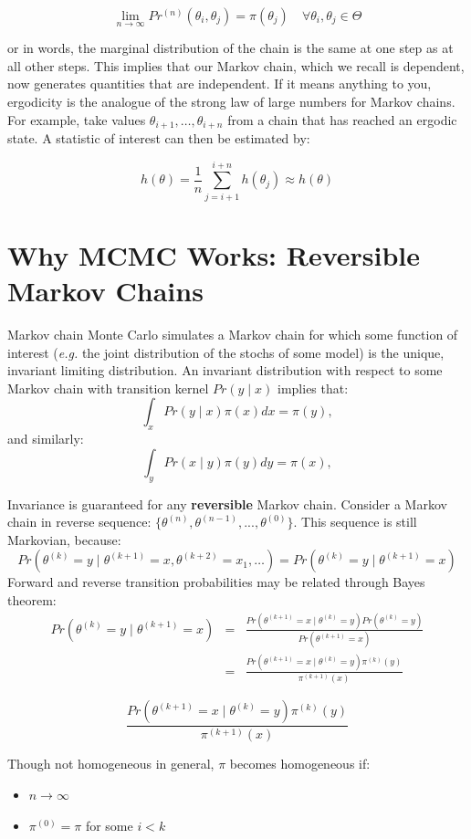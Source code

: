\documentclass[]{book}
\begin{document}
\begin{itemize}
\[
\lim_{n \to \infty} Pr^{(n)}(\theta_i,\theta_j) = \pi(\theta_j) \quad \forall \theta_i, \theta_j \in \Theta
\]

\noindent or in words, the marginal distribution of the chain is the same at one step as at all other steps. This implies that our Markov chain, which we recall is dependent, now generates quantities that are independent. If it means anything to you, ergodicity is the analogue of the strong law of large numbers for Markov chains. For example, take values $\theta_{i+1},\ldots,\theta_{i+n}$ from a chain that has reached an ergodic state. A statistic of interest can then be estimated by:

\[
\hat{h}(\theta) = \frac{1}{n}\sum_{j=i+1}^{i+n} h(\theta_j) \approx h(\theta)
\]

\end{itemize}

\section{Why MCMC Works: Reversible Markov Chains}

Markov chain Monte Carlo simulates a Markov chain for which some function of interest (\emph{e.g.} the joint distribution of the stochs of some model) is the unique, invariant limiting distribution. An invariant distribution with respect to some Markov chain with transition kernel $Pr(y \mid x)$ implies that:
\[
\int_x Pr(y \mid x) \pi(x) dx = \pi(y),
\]
and similarly:
\[
\int_y Pr(x \mid y) \pi(y) dy = \pi(x),
\]

Invariance is guaranteed for any \textbf{reversible} Markov chain. Consider a Markov chain in reverse sequence: $\{\theta^{(n)},\theta^{(n-1)},...,\theta^{(0)}\}$. This sequence is still Markovian, because:
\[
Pr(\theta^{(k)}=y \mid \theta^{(k+1)}=x,\theta^{(k+2)}=x_1,\ldots ) = Pr(\theta^{(k)}=y \mid \theta^{(k+1)}=x)
\]
Forward and reverse transition probabilities may be related through Bayes theorem:
\begin{eqnarray}
Pr(\theta^{(k)}=y \mid \theta^{(k+1)}=x) &=& \frac{Pr(\theta^{(k+1)}=x \mid \theta^{(k)}=y) Pr(\theta^{(k)}=y)}{Pr(\theta^{(k+1)}=x)} \nonumber \\
&=& \frac{Pr(\theta^{(k+1)}=x \mid \theta^{(k)}=y) \pi^{(k)}(y)}{\pi^{(k+1)}(x)} \nonumber
\end{eqnarray}

\[
\frac{Pr(\theta^{(k+1)}=x \mid \theta^{(k)}=y) \pi^{(k)}(y)}{\pi^{(k+1)}(x)}
\]

\noindent Though not homogeneous in general, $\pi$ becomes homogeneous if:
\begin{itemize}
\item $n \rightarrow \infty$
\item $\pi^{(0)}=\pi$ for some $i < k$
\end{itemize}
\end{document}
